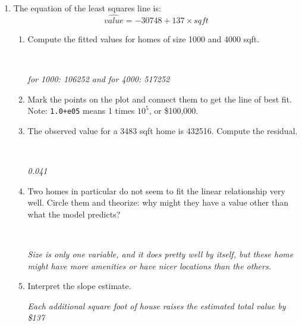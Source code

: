 \begin{enumerate}
  \item The equation of the least squares line is:
  $$  \widehat{value} =  -30748 + 137\times{sqft}$$
  \begin{enumerate}
  \item Compute the fitted values for homes of size 1000 and 4000 sqft.
\begin{students}
 \vspace{2cm}\\
\end{students}

\begin{key}
  {\it  for 1000: 106252  and for 4000: 517252 }
\end{key}
   \item  Mark the points on the plot and connect them to get the line
     of best fit.  \\
      Note: \verb|1.0+e05| means 1 times $10^5$, or \$100,000.  \vspace{.1in}
   \item The observed value for a 3483 sqft home is  432516.
     Compute the residual.
\begin{students}
 \vspace{2cm}\\
\end{students}

\begin{key}
  {\it  0.041}
\end{key}
   \item  Two homes in particular do not seem to fit the linear
     relationship very well.  Circle them and theorize: why might they
     have a value other than what the model predicts?  
\begin{students}
 \vspace{2cm}\\
\end{students}

\begin{key}
  {\it Size is only one variable, and it does pretty well by itself,
    but these home might have more amenities or have nicer locations
    than the others.}
\end{key}

\item Interpret the slope estimate. 
\begin{students}
 \vspace{2cm}
\end{students}

\begin{key}
  {\it Each additional square foot of house raises the estimated total
  value by \$137 }
\end{key}



\end{enumerate}
\end{enumerate}
